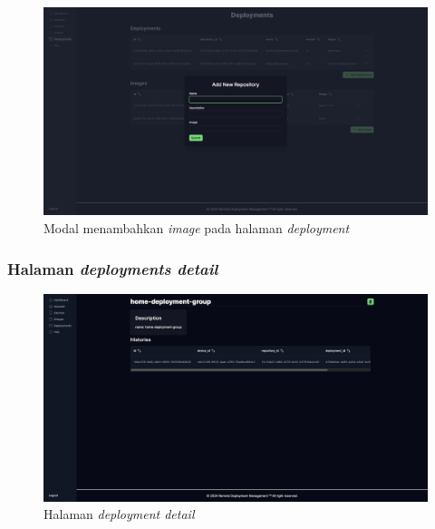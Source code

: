 \begin{figure}
  \centering
  \includegraphics[width=1\textwidth]{resources/chapter-4/dashboard/deployment-page-add-repostory.jpg}
  \caption{Modal menambahkan \textit{image} pada halaman \textit{deployment}}
  \label{fig:halaman-deployment-add-repostory}
\end{figure}

\pagebreak

\subsubsection{Halaman \textit{deployments detail}}

\begin{figure}
  \centering
  \includegraphics[width=1\textwidth]{resources/chapter-4/dashboard/deployment-detail-page.jpg}
  \caption{Halaman \textit{deployment detail}}
  \label{fig:halaman-deployment-detail}
\end{figure}

